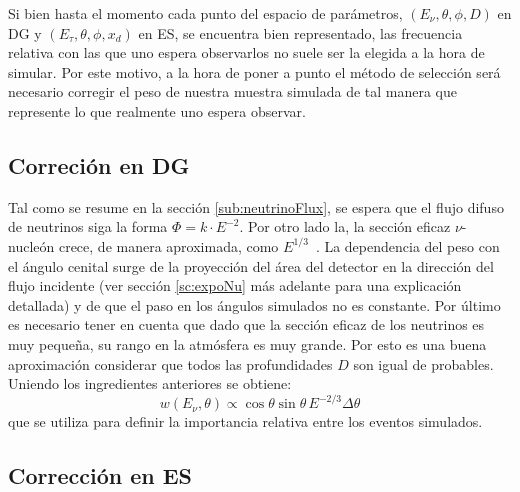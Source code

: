 	Si bien hasta el momento cada punto del espacio de parámetros, $(E_\nu,\theta,\phi,D)$ en DG y $(E_\tau,\theta,\phi,x_d)$ en ES, se encuentra bien representado, las frecuencia relativa con las que uno espera observarlos no suele ser la elegida a la hora de simular.
	Por este motivo, a la hora de poner a punto el método de selección será necesario corregir el peso de nuestra muestra simulada de tal manera que represente lo que realmente uno espera observar.
		
		\subsection{Correción en DG}
		
		Tal como se resume en la sección \ref{sub:neutrinoFlux}, se espera que el flujo difuso de neutrinos siga la forma $\Phi=k\cdot E^{-2}$. Por otro lado la, la sección eficaz $\nu$-nucleón crece, de manera aproximada, como $E^{1/3}$~\cite{cite:cooper_sarkar}.
		La dependencia del peso con el ángulo cenital surge de la proyección del área del detector en la dirección del flujo incidente (ver sección \ref{sc:expoNu} más adelante para una explicación detallada) y de que el paso en los ángulos simulados no es constante.
		Por último es necesario tener en cuenta que dado que la sección eficaz de los neutrinos es muy pequeña, su rango en la atmósfera es muy grande.
		Por esto es una buena aproximación considerar que todos las profundidades $D$ son igual de probables.
		Uniendo los ingredientes anteriores se obtiene:
		\begin{equation}
		w(E_\nu,\theta) \propto \cos\theta \sin\theta \, E^{-2/3} \Delta\theta
		\end{equation}
		que se utiliza para definir la importancia relativa entre los eventos simulados.
		
		\subsection{Corrección en ES}
		
